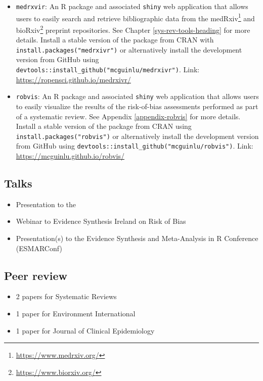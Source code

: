 \documentclass[a4paper, twoside]{templates/ociamthesis}
\providecommand{\tightlist}{%
  \setlength{\itemsep}{0pt}\setlength{\parskip}{0pt}}
\begin{document}
\begin{itemize}
\item
  \texttt{medrxvir}: An R package and associated \texttt{shiny} web application that allows users to easily search and retrieve bibliographic data from the medRxiv\footnote{\url{https://www.medrxiv.org/}} and bioRxiv\footnote{\url{https://www.biorxiv.org/}} preprint repositories. See Chapter \ref{sys-rev-tools-heading} for more details. Install a stable version of the package from CRAN with \texttt{install.packages("medrxivr")} or alternatively install the development version from GitHub using \texttt{devtools::install\_github("mcguinlu/medrxivr")}. Link: \url{https://ropensci.github.io/medrxivr/}
\item
  \texttt{robvis}: An R package and associated \texttt{shiny} web application that allows users to easily visualize the results of the risk-of-bias assessments performed as part of a systematic review. See Appendix \ref{appendix-robvis} for more details. Install a stable version of the package from CRAN using \texttt{install.packages("robvis")} or alternatively install the development version from GitHub using \texttt{devtools::install\_github("mcguinlu/robvis")}. Link: \url{https://mcguinlu.github.io/robvis/}
\end{itemize}

\hypertarget{talks}{%
\subsection{Talks}\label{talks}}

\begin{itemize}
\tightlist
\item
  Presentation to the
\item
  Webinar to Evidence Synthesis Ireland on Risk of Bias
\item
  Presentation(s) to the Evidence Synthesis and Meta-Analysis in R Conference (ESMARConf)
\end{itemize}

\hypertarget{peer-review}{%
\subsection{Peer review}\label{peer-review}}

\begin{itemize}
\tightlist
\item
  2 papers for Systematic Reviews
\item
  1 paper for Environment International
\item
  1 paper for Journal of Clinical Epidemiology
\end{itemize}
\end{document}
